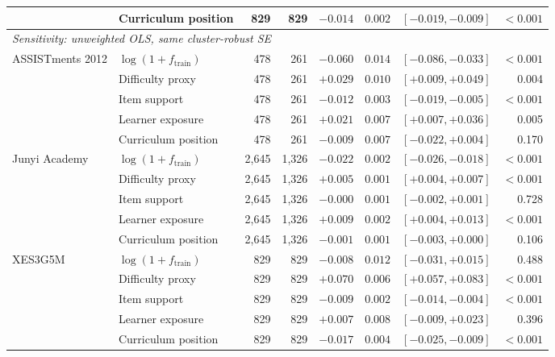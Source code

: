 \begin{table}[htbp]
\begin{tabular}{llrrrrrr}
 & Curriculum position & 829 & 829 & $-0.014$ & $0.002$ & $[-0.019,-0.009]$ & $<0.001$ \\
\midrule
\multicolumn{8}{l}{\emph{Sensitivity: unweighted OLS, same cluster-robust SE}} \\
ASSISTments 2012 & $\log(1+f_{\mathrm{train}})$ & 478 & 261 & $-0.060$ & $0.014$ & $[-0.086,-0.033]$ & $<0.001$ \\
 & Difficulty proxy & 478 & 261 & $+0.029$ & $0.010$ & $[+0.009,+0.049]$ & 0.004 \\
 & Item support & 478 & 261 & $-0.012$ & $0.003$ & $[-0.019,-0.005]$ & $<0.001$ \\
 & Learner exposure & 478 & 261 & $+0.021$ & $0.007$ & $[+0.007,+0.036]$ & 0.005 \\
 & Curriculum position & 478 & 261 & $-0.009$ & $0.007$ & $[-0.022,+0.004]$ & 0.170 \\
\midrule
Junyi Academy & $\log(1+f_{\mathrm{train}})$ & 2,645 & 1,326 & $-0.022$ & $0.002$ & $[-0.026,-0.018]$ & $<0.001$ \\
 & Difficulty proxy & 2,645 & 1,326 & $+0.005$ & $0.001$ & $[+0.004,+0.007]$ & $<0.001$ \\
 & Item support & 2,645 & 1,326 & $-0.000$ & $0.001$ & $[-0.002,+0.001]$ & 0.728 \\
 & Learner exposure & 2,645 & 1,326 & $+0.009$ & $0.002$ & $[+0.004,+0.013]$ & $<0.001$ \\
 & Curriculum position & 2,645 & 1,326 & $-0.001$ & $0.001$ & $[-0.003,+0.000]$ & 0.106 \\
\midrule
XES3G5M & $\log(1+f_{\mathrm{train}})$ & 829 & 829 & $-0.008$ & $0.012$ & $[-0.031,+0.015]$ & 0.488 \\
 & Difficulty proxy & 829 & 829 & $+0.070$ & $0.006$ & $[+0.057,+0.083]$ & $<0.001$ \\
 & Item support & 829 & 829 & $-0.009$ & $0.002$ & $[-0.014,-0.004]$ & $<0.001$ \\
 & Learner exposure & 829 & 829 & $+0.007$ & $0.008$ & $[-0.009,+0.023]$ & 0.396 \\
 & Curriculum position & 829 & 829 & $-0.017$ & $0.004$ & $[-0.025,-0.009]$ & $<0.001$ \\
\bottomrule
\end{tabular}
\end{table}
